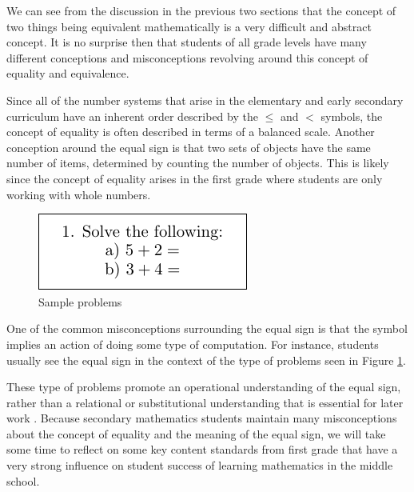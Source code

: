 \documentclass[
]{book}
\theoremstyle{definition}
\theoremstyle{definition}
\theoremstyle{definition}
\theoremstyle{definition}
\theoremstyle{remark}
\begin{document}
We can see from the discussion in the previous two sections that the concept of two things being equivalent mathematically is a very difficult and abstract concept. It is no surprise then that students of all grade levels have many different conceptions and misconceptions revolving around this concept of equality and equivalence.

Since all of the number systems that arise in the elementary and early secondary curriculum have an inherent order described by the \(\leq\) and \(<\) symbols, the concept of equality is often described in terms of a balanced scale. Another conception around the equal sign is that two sets of objects have the same number of items, determined by counting the number of objects. This is likely since the concept of equality arises in the first grade where students are only working with whole numbers.

\begin{figure}

{\centering \includegraphics[width=0.35\linewidth]{tikz/sample_addition_problem} 

}

\caption{Sample problems}\label{fig:equality-operation}
\end{figure}

One of the common misconceptions surrounding the equal sign is that the symbol implies an action of doing some type of computation. For instance, students usually see the equal sign in the context of the type of problems seen in Figure \ref{fig:equality-operation}.

These type of problems promote an operational understanding of the equal sign, rather than a relational or substitutional understanding that is essential for later work \citep[pp.~145-150]{Cognition}. Because secondary mathematics students maintain many misconceptions about the concept of equality and the meaning of the equal sign, we will take some time to reflect on some key content standards from first grade that have a very strong influence on student success of learning mathematics in the middle school.
\end{document}

